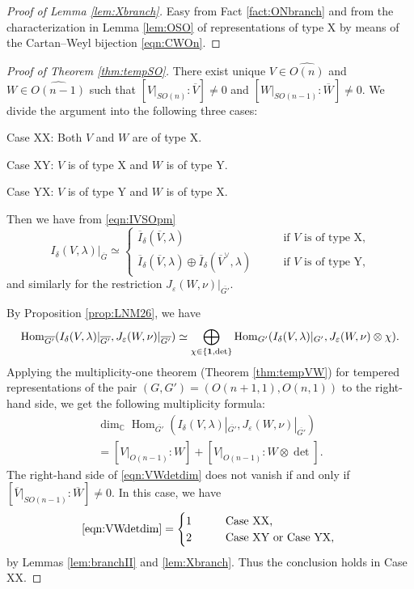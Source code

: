 \begin{proof}
[Proof of Lemma \ref{lem:Xbranch}]
Easy from Fact \ref{fact:ONbranch} and from the characterization in Lemma \ref{lem:OSO}
 of representations of type X
 by means of the Cartan--Weyl bijection \eqref{eqn:CWOn}.  
\end{proof}
\begin{proof}
[Proof of Theorem \ref{thm:tempSO}]
There exist unique $V \in \widehat{O(n)}$ and $W \in \widehat{O(n-1)}$
such that $[V|_{SO(n)}:\overline V]\ne0$
 and $[W|_{SO(n-1)}:\overline W]\ne0$.  
We divide the argument into the following three cases:

Case XX: Both $V$ and $W$ are of type X. 

Case XY: $V$ is of type X and $W$ is of type Y.  

Case YX: $V$ is of type Y and $W$ is of type X.  


Then we have from \eqref{eqn:IVSOpm}
\[
{I}_{\delta}(V, \lambda)|_{\overline G}
\simeq
\begin{cases} 
  \overline {I}_{\delta}(\overline V, \lambda)
 &\text{if $V$ is of type X,}
\\
\overline{I}_{\delta}(\overline V, \lambda)
\oplus
\overline {I}_{\delta}(\overline V^{\vee}, \lambda)
\qquad
 &\text{if $V$ is of type Y,}
\end{cases}
\]
and similarly for the restriction $J_{\varepsilon}(W, \nu)|_{\overline {G'}}$.  


By Proposition \ref{prop:LNM26}, 
 we have
\begin{equation*}
  {\operatorname{Hom}}_{\overline{G'}} 
  ({I}_{\delta}(V, \lambda)|_{\overline {G'}}, 
   {J}_{\varepsilon}(W, \nu)|_{\overline {G'}})
   \simeq
   \bigoplus_{\chi \in \{{\bf{1}},\det\}}
   {\operatorname{Hom}}_{G'}({{I}_{\delta}(V, \lambda)|_{G'}},
   J_{\varepsilon}(W, \nu) \otimes \chi).  
\end{equation*}
Applying the 
multiplicity-one theorem (Theorem \ref{thm:tempVW})
 for tempered representations 
 of the pair $(G,G')=(O(n+1,1),O(n,1))$
 to the right-hand side, 
 we get the following multiplicity formula:
\begin{multline}
\label{eqn:VWdetdim}
     \dim_{\mathbb{C}} {\operatorname{Hom}}_{\overline{G'}} 
  ({I}_{\delta}(V, \lambda)|_{\overline {G'}}, 
   {J}_{\varepsilon}(W, \nu)|_{\overline {G'}})
\\
=[V|_{O(n-1)}:W]+[V|_{O(n-1)}:W \otimes \det].  
\end{multline}
The right-hand side of \eqref{eqn:VWdetdim} does not vanish
 if and only if 
 $[\overline V|_{SO(n-1)}:\overline W] \ne 0$.  
In this case,
 we have 
\begin{equation*}
\text{\eqref{eqn:VWdetdim}}
=\begin{cases}
  1 \qquad &\text{Case XX, }
\\
  2 \qquad &\text{Case XY or Case YX, }
  \end{cases}
\end{equation*}
by Lemmas \ref{lem:branchII} and \ref{lem:Xbranch}.  
Thus the conclusion holds in Case XX.   




\end{proof}
